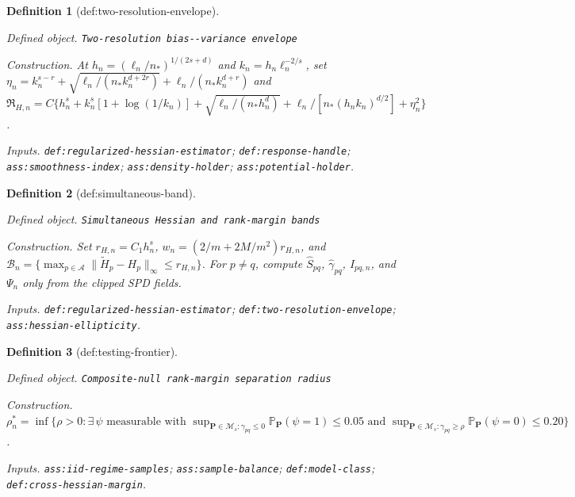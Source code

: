 \documentclass{article}
\newtheorem{definition}{Definition}
\begin{document}
\begin{definition}[def:two-resolution-envelope]\label{def:two-resolution-envelope}
\par\smallskip\noindent\emph{Defined object.} \texttt{Two-\allowbreak{}resolution bias-\allowbreak{}-\allowbreak{}variance envelope}
\par\smallskip\noindent\emph{Construction.} At \(h_n=(\ell_n/n_\ast)^{1/(2s+d)}\) and \(k_n=h_n\ell_n^{-2/s}\), set \(\eta_n=k_n^{s-r}+\sqrt{\ell_n/(n_\ast k_n^{d+2r})}+\ell_n/(n_\ast k_n^{d+r})\) and \(\mathfrak R_{H,n}=C\{h_n^s+k_n^s[1+\log(1/k_n)]+\sqrt{\ell_n/(n_\ast h_n^d)}+\ell_n/[n_\ast(h_nk_n)^{d/2}]+\eta_n^2\}\).
\par\smallskip\noindent\emph{Inputs.} \texttt{def:\allowbreak{}regularized-\allowbreak{}hessian-\allowbreak{}estimator}; \texttt{def:\allowbreak{}response-\allowbreak{}handle}; \texttt{ass:\allowbreak{}smoothness-\allowbreak{}index}; \texttt{ass:\allowbreak{}density-\allowbreak{}holder}; \texttt{ass:\allowbreak{}potential-\allowbreak{}holder}.
\end{definition}

\begin{definition}[def:simultaneous-band]\label{def:simultaneous-band}
\par\smallskip\noindent\emph{Defined object.} \texttt{Simultaneous Hessian and rank-\allowbreak{}margin bands}
\par\smallskip\noindent\emph{Construction.} Set \(r_{H,n}=C_1h_n^s\), \(w_n=(2/m+2M/m^2)r_{H,n}\), and \(\mathcal B_n=\{\max_{p\in\mathcal A}\lVert\widetilde H_p-H_p\rVert_\infty\le r_{H,n}\}\). For \(p\ne q\), compute \(\widehat S_{pq}\), \(\widehat\gamma_{pq}\), \(I_{pq,n}\), and \(\Psi_n\) only from the clipped SPD fields.
\par\smallskip\noindent\emph{Inputs.} \texttt{def:\allowbreak{}regularized-\allowbreak{}hessian-\allowbreak{}estimator}; \texttt{def:\allowbreak{}two-\allowbreak{}resolution-\allowbreak{}envelope}; \texttt{ass:\allowbreak{}hessian-\allowbreak{}ellipticity}.
\end{definition}

\begin{definition}[def:testing-frontier]\label{def:testing-frontier}
\par\smallskip\noindent\emph{Defined object.} \texttt{Composite-\allowbreak{}null rank-\allowbreak{}margin separation radius}
\par\smallskip\noindent\emph{Construction.} \(\rho_n^\ast=\inf\{\rho>0:\exists\,\psi\text{ measurable with }\sup_{\mathbf P\in\mathcal M_s:\gamma_{pq}\le0}\mathbb P_{\mathbf P}(\psi=1)\le0.05\text{ and }\sup_{\mathbf P\in\mathcal M_s:\gamma_{pq}\ge\rho}\mathbb P_{\mathbf P}(\psi=0)\le0.20\}\).
\par\smallskip\noindent\emph{Inputs.} \texttt{ass:\allowbreak{}iid-\allowbreak{}regime-\allowbreak{}samples}; \texttt{ass:\allowbreak{}sample-\allowbreak{}balance}; \texttt{def:\allowbreak{}model-\allowbreak{}class}; \texttt{def:\allowbreak{}cross-\allowbreak{}hessian-\allowbreak{}margin}.
\end{definition}
\end{document}
